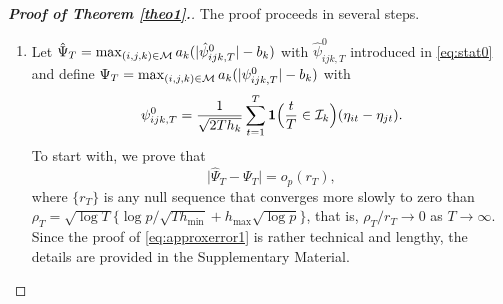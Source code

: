 \documentclass[a4paper,12pt]{article}
\numberwithin{equation}{section}
\begin{document}
\begin{proof}[\textnormal{\textbf{Proof of Theorem \ref{theo1}.}}] The proof proceeds in several steps. 
\begin{enumerate}[label=\textit{Step \arabic*.}, leftmargin=0cm, itemindent=1.45cm]


\item Let $\hat{\Psi}_T = \max_{(i,j,k) \in \mathcal{M}} a_k (|\hat{\psi}_{ijk,T}^0| - b_k)$ with $\hat{\psi}_{ijk,T}^0$ introduced in \eqref{eq:stat0} and define $\Psi_T = \max_{(i,j,k) \in \mathcal{M}} a_k (|\psi_{ijk,T}^0| - b_k)$ with 
\[ \psi_{ijk,T}^0 = \frac{1}{\sqrt{2Th_k}} \sum\limits_{t=1}^T \boldsymbol{1}\Big(\frac{t}{T} \in \mathcal{I}_k\Big) (\eta_{it} - \eta_{jt}). \]
To start with, we prove that  
\begin{equation}\label{eq:approxerror1}
\big| \hat{\Psi}_T - \Psi_T \big| = o_p(r_T),
\end{equation}
where $\{r_T\}$ is any null sequence that converges more slowly to zero than $\rho_T = \sqrt{\log T} \{ \log p/\sqrt{Th_{\min}} + h_{\max} \sqrt{\log p} \}$, that is, $\rho_T/r_T \rightarrow 0$ as $T \rightarrow \infty$. Since the proof of \eqref{eq:approxerror1} is rather technical and lengthy, the details are provided in the Supplementary Material. 



\end{enumerate}
\end{proof}
\end{document}
